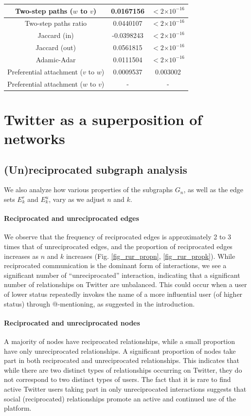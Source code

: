 \documentclass[conference]{IEEEtran}
\providecommand{\e}[1]{\ensuremath{\times 10^{#1}}}
\begin{document}
\begin{table}[!t]
\begin{tabular}{|c||c|c|}
Two-step paths ($w$ to $v$)   &    0.0167156  & $< 2 \e{-16} $\\
\hline
Two-step paths ratio &   0.0440107 & $< 2 \e{-16} $\\
Jaccard (in) & -0.0398243 & $< 2 \e{-16} $\\
Jaccard (out) &   0.0561815  & $< 2 \e{-16} $\\
Adamic-Adar  & 0.0111504 & $< 2 \e{-16} $ \\
Preferential attachment ($v$ to $w$) & 0.0009537 & 0.003002 \\
Preferential attachment ($w$ to $v$)  &  - & -  \\
\hline
\end{tabular}
\end{table}

\section{Twitter as a superposition of networks}

\subsection{(Un)reciprocated subgraph analysis}
We also analyze how various properties of the subgraphs $G_n$, as well as the edge sets $E^r_k$ and $E^u_k$, vary as we adjust $n$ and $k$.

\paragraph*{Reciprocated and unreciprocated edges} We observe that the frequency of reciprocated edges is approximately 2 to 3 times that of unreciprocated edges, and the proportion of reciprocated edges increases as $n$ and $k$ increases (Fig. \ref{fig_rur_propn}, \ref{fig_rur_propk}). 
While reciprocated communication is the dominant form of interactions, we see a significant number of ``unreciprocated'' interaction, indicating that a significant number of relationships on Twitter are unbalanced. 
This could occur when a user of lower status repeatedly invokes
the name of a
more influential user (of higher status) through @-mentioning,
as suggested in the introduction.

\paragraph*{Reciprocated and unreciprocated nodes} A majority of nodes have reciprocated relationships, while a small proportion have only unreciprocated relationships. 
A significant proportion of nodes take part in both reciprocated and unreciprocated relationships.  This indicates that while there are two distinct types of relationships occurring on Twitter, they do not correspond to two distinct types of users. 
The fact that it is rare to find 
active Twitter users taking part in only unreciprocated interactions
suggests that 
social (reciprocated) relationships promote an active and continued use of the platform.
\end{document}
